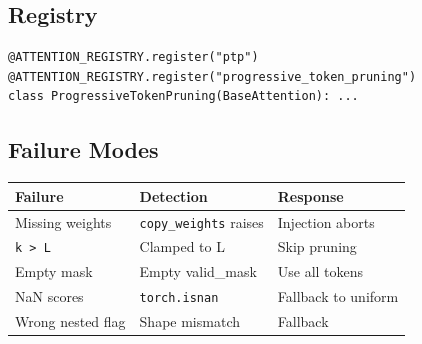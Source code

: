 \subsection{Registry}

\begin{lstlisting}
@ATTENTION_REGISTRY.register("ptp")
@ATTENTION_REGISTRY.register("progressive_token_pruning")
class ProgressiveTokenPruning(BaseAttention): ...
\end{lstlisting}

\subsection{Failure Modes}

\begin{table}[H]
\centering
\small
\begin{tabular}{lll}
\toprule
\textbf{Failure} & \textbf{Detection} & \textbf{Response} \\
\midrule
Missing weights & \texttt{copy\_weights} raises & Injection aborts \\
\texttt{k > L} & Clamped to L & Skip pruning \\
Empty mask & Empty valid\_mask & Use all tokens \\
NaN scores & \texttt{torch.isnan} & Fallback to uniform \\
Wrong nested flag & Shape mismatch & Fallback \\
\bottomrule
\end{tabular}
\end{table}

